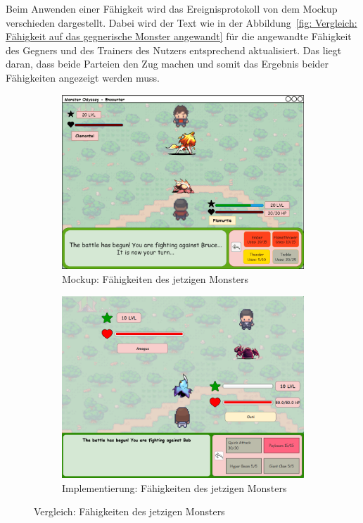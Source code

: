 Beim Anwenden einer Fähigkeit wird das Ereignisprotokoll von dem Mockup verschieden dargestellt. Dabei wird der Text wie in der Abbildung~\ref{fig: Vergleich: Fähigkeit auf das gegnerische Monster angewandt} für die angewandte Fähigkeit des Gegners und des Trainers des Nutzers entsprechend aktualisiert. Das liegt daran, dass beide Parteien den Zug machen und somit das Ergebnis beider Fähigkeiten angezeigt werden muss. 
\begin{figure}[H]
    \centering
    \begin{subfigure}[b]{0.4\textwidth}
        \includegraphics[width=\textwidth]{images/mockups/Encounter/Encounter1v1Abilities.png}
        \caption{Mockup: \phantom{desdes jetz}Fähigkeiten des jetzigen Monsters}
        \label{fig: Mockup: Fähigkeiten des jetzigen Monsters}
    \end{subfigure}
    \hfill
    \begin{subfigure}[b]{0.4\textwidth}
        \includegraphics[width=\textwidth]{images/implementation/Encounter/abilities.PNG}
        \caption{Implementierung: Fähigkeiten des jetzigen Monsters}
        \label{fig: Implementierung: Fähigkeiten des jetzigen Monsters}
    \end{subfigure}
    \caption{Vergleich: Fähigkeiten des jetzigen Monsters}
    \label{fig: Vergleich: Fähigkeiten des jetzigen Monsters}
\end{figure}
